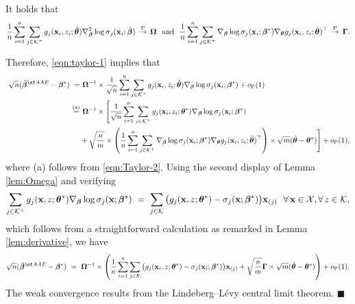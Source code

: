{\begin{lem} 
\label{lem:Omega}
It holds that 
\begin{align*}
        \frac{1}{n} \sum_{i=1}^n \sum_{j\in \mathcal{K}^+} g_j(\mathbf{x}_i, z_i; \hat{\bm{\theta}})\nabla^2_{\bm{\beta}}\log \sigma_j(\mathbf{x}_i; \tilde{\bm{\beta}}) \,\overset{\text{\upshape{P}}}{\rightarrow}\, \bm{\Omega} ~~\text{and}~~\frac{1}{{n}}\sum_{i=1}^n\sum_{j\in \mathcal{K}^+}
    \nabla_{\bm{\beta}}\log \sigma_j(\mathbf{x}_i; {\bm{\beta}}^*) \nabla_{\bm{\theta}}g_j(\mathbf{x}_i, z_i; \tilde{\bm{\theta}})^{\top} \,\overset{\text{\upshape{P}}}{\rightarrow}\, \bm{\Gamma}.
\end{align*}
\end{lem}
Therefore, \eqref{eqn:taylor-1} implies that 
\begin{align*}
    ~\sqrt{n}(\hat{\betavec}^{\sf AAE} - \betavec^*)
    ~=&~\Omegavec^{-1}\times \frac{1}{\sqrt{n}}\sum_{i=1}^n\sum_{j\in \Kscr^+}g_j(\x_i, z_i; \hat{\thetavec})\nabla_{\betavec}\log \sigma_j(\x_i; {\betavec}^*) + o_{\text{\upshape{P}}}(1)\\
    ~\stackrel{\text{(a)}}{=}&~\Omegavec^{-1}\times \Bigg[\frac{1}{\sqrt{n}}\sum_{i=1}^n\sum_{j\in \Kscr^+}
    g_j(\x_i, z_i; {\thetavec}^*)\nabla_{\betavec}\log \sigma_j(\x_i; {\betavec}^*)\\
    &+ \sqrt{\frac{n}{m}}\times
    \left(\frac{1}{{n}}\sum_{i=1}^n\sum_{j\in \Kscr^+}
    \nabla_{\betavec}\log \sigma_j(\x_i; {\betavec}^*) \nabla_{\thetavec}g_j(\x_i, z_i; \tilde{\thetavec})^{\top}\right)\times
      \sqrt{m}(\hat{\thetavec} - \thetavec^*)\Bigg]
     + o_{\text{\upshape{P}}}(1),
\end{align*}
where (a) follows from \eqref{eqn:Taylor-2}.
Using the second display of Lemma \ref{lem:Omega} and verifying 
$$
\sum_{j\in \mathcal{K}^+}
    g_j(\mathbf{x}, z; {\bm{\theta}}^*)\nabla_{\bm{\beta}}\log \sigma_j(\mathbf{x}; {\bm{\beta}}^*) ~=~\sum_{j\in \mathcal{K}}\big(g_j(\mathbf{x}, z; {\bm{\theta}}^*) - \sigma_{j}(\mathbf{x}; \bm{\beta}^*)\big)\mathbf{x}_{(j)}~~\forall\, \mathbf{x} \in \mathcal{X}, \forall\, z \in \mathcal{K},
$$
which follows from a straightforward calculation as remarked in Lemma \ref{lem:derivative},
we have 
$$\sqrt{n}(\hat{\betavec}^{\sf AAE} - \betavec^*)~=~ \Omegavec^{-1}\times \left(\frac{1}{n}\sum_{i=1}^n  \sum_{j\in \Kscr}\big(g_j(\x_i, z; {\thetavec}^*) - \sigma_{j}(\x_i; \betavec^*)\big)\x_{(j)} + \sqrt{\frac{n}{m}} \Gammavec\times \sqrt{m}(\hat{\thetavec} - \thetavec^*)\right) + o_{\text{\upshape{P}}}(1).
$$
The weak convergence results from the Lindeberg–L\'evy central limit theorem.
\hfill $\blacksquare$}
\vspace{3mm}

